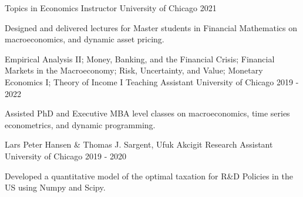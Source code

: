 

\begin{cventries}
	\cventry
	{Topics in Economics}
	{Instructor}
	{University of Chicago}
	{2021}
	{\begin{cvitems}
			\item Designed and delivered lectures for Master students in Financial Mathematics on macroeconomics, and dynamic asset pricing.
		\end{cvitems}}


	\cventry
	{Empirical Analysis II; Money, Banking, and the Financial Crisis; Financial Markets in the Macroeconomy; Risk, Uncertainty, and Value; Monetary Economics I; Theory of Income I}
	{Teaching Assistant}
	{University of Chicago}
	{2019 - 2022}
	{\begin{cvitems}
			\item Assisted PhD and Executive MBA level classes on macroeconomics, time series econometrics, and dynamic programming.
		\end{cvitems}}

	\cventry
	{Lars Peter Hansen \& Thomas J. Sargent, Ufuk Akcigit}
	{Research Assistant}
	{University of Chicago}
	{2019 - 2020}
	{\begin{cvitems}
			\item Developed a quantitative model of the optimal taxation for R\&D Policies in the US using Numpy and Scipy.
		\end{cvitems}}
\end{cventries}
